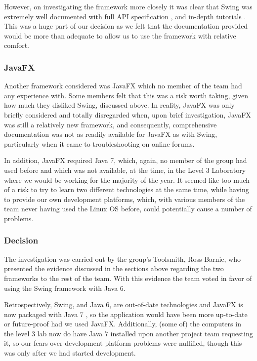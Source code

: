 However, on investigating the framework more closely it was clear that
Swing was extremely well documented with full API specification
\cite{swingAPI}, and in-depth tutorials \cite{swingTutorial}.
This was a huge part of our decision as we felt that the documentation
provided would be more than adequate to allow us to use the framework
with relative comfort.


\subsubsection{JavaFX}
\label{impl:ui:guiframework:javafx}

Another framework considered was JavaFX which no member of the team
had any experience with. 
Some members felt that this was a risk worth taking, given how much
they disliked Swing, discussed above.
In reality, JavaFX was only briefly considered and totally disregarded
when, upon brief investigation, JavaFX was still a relatively new
framework, and consequently, comprehensive documentation was not as
readily available for JavaFX as with Swing, particularly when it came 
to troubleshooting on online forums.

In addition, JavaFX required Java 7, which, again, no member of the
group had used before and which was not available, at the time, in the
Level 3 Laboratory where we would be working for the majority of the
year.
It seemed like too much of a risk to try to learn two different
technologies at the same time, while having to provide our own
development platforms, which, with various members of the team never
having used the Linux OS before, could potentially cause a number of
problems.


\subsubsection{Decision}
\label{impl:ui:guiframework:decision}

The investigation was carried out by the group's Toolsmith, Ross
Barnie, who presented the evidence discussed in the sections above
regarding the two frameworks to the rest of the team.
With this evidence the team voted in favor of using the Swing
framework with Java 6.

Retrospectively, Swing, and Java 6, are out-of-date technologies and
JavaFX is now packaged with Java 7 \cite{javafxOverview}, so the
application would have been more up-to-date or future-proof had we
used JavaFX.
Additionally, (some of) the computers in the level 3 lab now do have
Java 7 installed upon another project team requesting it, so our fears
over development platform problems were nullified, though this was
only after we had started development.

